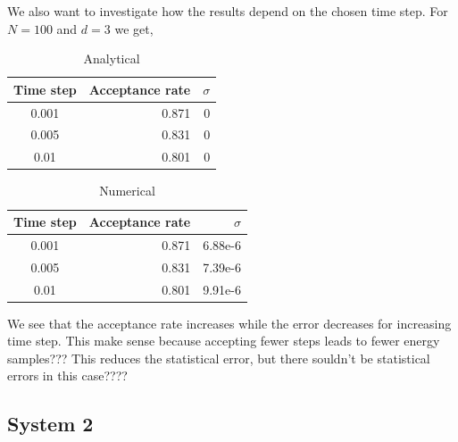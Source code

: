 \documentclass[english, a4paper]{article}
\begin{document}
\noindent We also want to investigate how the results depend on the chosen time step.
For $N = 100$ and $d = 3$ we get,
\begin{table}[H]
  \centering
  \begin{tabular}{ | c | r | r |}
    \hline
    Time step& Acceptance rate& $\sigma$ \\*
    \hline
    0.001& 0.871& 0 \\*
    \hline
    0.005& 0.831& 0 \\*
    \hline
    0.01&  0.801& 0 \\*
    \hline
  \end{tabular}
  \caption{Analytical}
  \label{tab:Tabell1}
\end{table}

\begin{table}[H]
  \centering
  \begin{tabular}{ | c | r | r |}
    \hline
    Time step& Acceptance rate& $\sigma$ \\*
    \hline
    0.001& 0.871& 6.88e-6 \\*
    \hline
    0.005& 0.831& 7.39e-6 \\*
    \hline
    0.01&  0.801& 9.91e-6 \\*
    \hline
  \end{tabular}
  \caption{Numerical}
  \label{tab:Tabell1}
\end{table}
We see that the acceptance rate increases while the error decreases for increasing time step.
This make sense because accepting fewer steps leads to fewer energy samples???
This reduces the statistical error, but there souldn't be statistical errors in this case????

\subsection{System 2}
\end{document}
